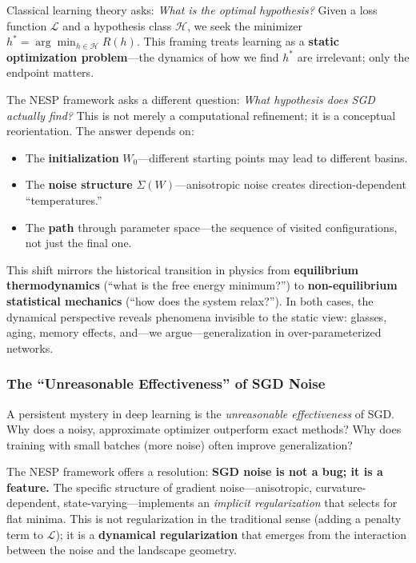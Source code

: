 \documentclass[
  journal=largetwo,
  simfonts=false,
  year=2025,
  volume=37,
]{cup-journal}
\begin{document}
Classical learning theory asks: \textit{What is the optimal hypothesis?} Given a loss function $\mathcal{L}$ and a hypothesis class $\mathcal{H}$, we seek the minimizer $h^* = \arg\min_{h \in \mathcal{H}} R(h)$. This framing treats learning as a \textbf{static optimization problem}---the dynamics of how we find $h^*$ are irrelevant; only the endpoint matters.

The NESP framework asks a different question: \textit{What hypothesis does SGD actually find?} This is not merely a computational refinement; it is a conceptual reorientation. The answer depends on:
\begin{itemize}
    \item The \textbf{initialization} $W_0$---different starting points may lead to different basins.
    \item The \textbf{noise structure} $\Sigma(W)$---anisotropic noise creates direction-dependent ``temperatures.''
    \item The \textbf{path} through parameter space---the sequence of visited configurations, not just the final one.
\end{itemize}

This shift mirrors the historical transition in physics from \textbf{equilibrium thermodynamics} (``what is the free energy minimum?'') to \textbf{non-equilibrium statistical mechanics} (``how does the system relax?''). In both cases, the dynamical perspective reveals phenomena invisible to the static view: glasses, aging, memory effects, and---we argue---generalization in over-parameterized networks.

\subsubsection{The ``Unreasonable Effectiveness'' of SGD Noise}

A persistent mystery in deep learning is the \textit{unreasonable effectiveness} of SGD. Why does a noisy, approximate optimizer outperform exact methods? Why does training with small batches (more noise) often improve generalization?

The NESP framework offers a resolution: \textbf{SGD noise is not a bug; it is a feature.} The specific structure of gradient noise---anisotropic, curvature-dependent, state-varying---implements an \textit{implicit regularization} that selects for flat minima. This is not regularization in the traditional sense (adding a penalty term to $\mathcal{L}$); it is a \textbf{dynamical regularization} that emerges from the interaction between the noise and the landscape geometry.
\end{document}
